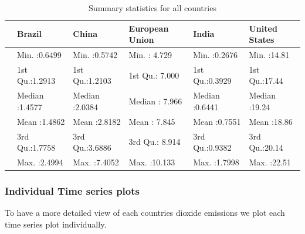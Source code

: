 \documentclass[
]{article}
\begin{document}
\begin{table}

\caption{\label{tab:sumstats}Summary statistics for all countries}
\centering
\begin{tabular}[t]{l|l|l|l|l|l}
\hline
  &     Brazil &     China & European Union &     India & United States\\
\hline
 & Min.   :0.6499 & Min.   :0.5742 & Min.   : 4.729 & Min.   :0.2676 & Min.   :14.81\\
\hline
 & 1st Qu.:1.2913 & 1st Qu.:1.2103 & 1st Qu.: 7.000 & 1st Qu.:0.3929 & 1st Qu.:17.44\\
\hline
 & Median :1.4577 & Median :2.0384 & Median : 7.966 & Median :0.6441 & Median :19.24\\
\hline
 & Mean   :1.4862 & Mean   :2.8182 & Mean   : 7.845 & Mean   :0.7551 & Mean   :18.86\\
\hline
 & 3rd Qu.:1.7758 & 3rd Qu.:3.6886 & 3rd Qu.: 8.914 & 3rd Qu.:0.9382 & 3rd Qu.:20.14\\
\hline
 & Max.   :2.4994 & Max.   :7.4052 & Max.   :10.133 & Max.   :1.7998 & Max.   :22.51\\
\hline
\end{tabular}
\end{table}

\newpage

\hypertarget{individual-time-series-plots}{%
\subsubsection{Individual Time series
plots}\label{individual-time-series-plots}}

To have a more detailed view of each countries dioxide emissions we plot
each time series plot individually.
\end{document}
